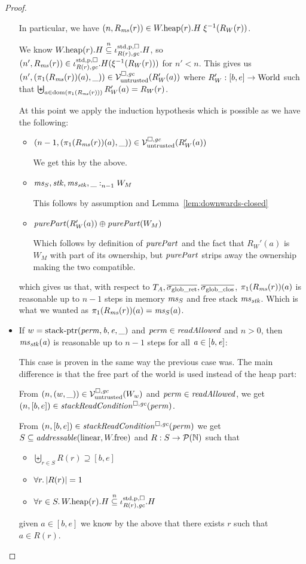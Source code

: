 \documentclass[a4paper]{article}
\begin{document}
\begin{proof}
\begin{itemize}
    In particular, we have $\npair{R_\ms(r)} \in \pwheap(r).H \; \xi^{-1}(R_W(r))$.
    
    We know $\pwheap(r).H \nsubeq \stdreg{R(r),\gc}{\pur}.H$, so $\npair[n']{R_\ms(r)} \in \stdreg{R(r),\gc}{\pur}.H(\xi^{-1}(R_W(r)))$ for $n' < n$.
    This gives us $\npair[n']{(\pi_1(R_\ms(r))(a),\_)} \in \lrv(R_W'(a))$ where $R_W' : [b,e] \fun \World$ such that $\biguplus_{a \in \dom(\pi_1(R_\ms(r)))} R_W'(a) = R_W(r)$.

    At this point we apply the induction hypothesis which is possible as we have
    the following:
    \begin{itemize}
    \item $\npair[n-1]{(\pi_1(R_\ms(r))(a),\_)} \in \lrv(R_W'(a))$

      We get this by the above.
    \item $\memSat[n-1]{\ms_S,\stk,\ms_\stk,\_}{W_M}$

      This follows by assumption and Lemma~\ref{lem:downwards-closed}
    \item $\purePart{R_W'(a)} \oplus \purePart{W_M}$

      Which follows by definition of $\purePart{}$ and the fact that $R_W'(a)$ is $W_M$ with part of its ownership, but $\purePart{}$ strips away the ownership making the two compatible.
    \end{itemize}
    which gives us that, with respect to $\ta,\gsigrets,\gsigcloss$, $\pi_1(R_\ms(r))(a)$ is reasonable up to $n-1$ steps in memory $\ms_S$ and free stack $\ms_\stk$.
    Which is what we wanted as $\pi_1(R_\ms(r))(a) = \ms_S(a)$.

  \item If $w = \stkptr{\perm,\baddr,\eaddr,\_}$ and $\perm \in \readAllowed{}$ and $n > 0$, then $\ms_\stk(\aaddr)$ is reasonable up to $n - 1$ steps for all $\aaddr \in [\baddr,\eaddr]$:

    This case is proven in the same way the previous case was.
    The main difference is that the free part of the world is used instead of the heap part:

    From $\npair{(w,\_)} \in \lrv(W_w)$ and $\perm \in \readAllowed{}$, we get $\npair{[b,e]} \in \stackReadCond{\perm}$.

    From $\npair{[b,e]} \in \stackReadCond{\perm}$ we get $S\subseteq
    \addressable{\linear,\pwfree}$ and $R : S \fun \powerset{\nats}$ such that
    \begin{itemize}
    \item $\biguplus_{r\in S} R(r) \supseteq [b,e]$
    \item $\forall r\ldotp |R(r)|  = 1$
    \item $\forall r \in S \ldotp \pwheap(r).H \nsubeq \stdreg{R(r),\gc}{\pur}.H$
    \end{itemize}
    given $a \in [b,e]$ we know by the above that there exists $r$ such that $a \in R(r)$.


\end{itemize}
\end{proof}
\end{document}
